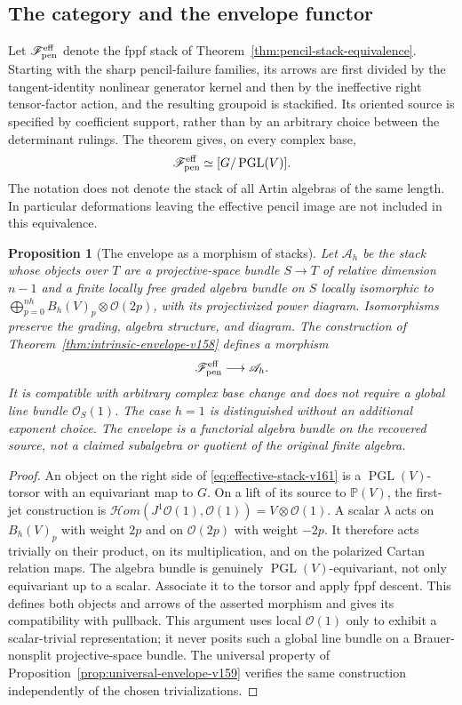\documentclass[11pt,reqno]{amsart}
\numberwithin{equation}{section}
\newtheorem{proposition}[theorem]{Proposition}
\theoremstyle{definition}\newtheorem{definition}[theorem]{Definition}
\theoremstyle{remark}\newtheorem{remark}[theorem]{Remark}
\newcommand{\Pj}{\mathbb P}\newcommand{\A}{\mathbb A}
\newcommand{\OO}{\mathcal O}\newcommand{\II}{\mathcal I}
\begin{document}
\subsection{The category and the envelope functor}
Let $\mathscr F_{\rm pen}^{\rm eff}$ denote the fppf stack of
Theorem~\ref{thm:pencil-stack-equivalence}. Starting with the sharp
pencil-failure families, its arrows are first divided by the
tangent-identity nonlinear generator kernel and then by the ineffective
right tensor-factor action, and the resulting groupoid is stackified.
Its oriented source is specified by coefficient support, rather than
by an arbitrary choice between the determinant rulings. The theorem
gives, on every complex base,
\begin{equation}\label{eq:effective-stack-v161}
       \mathscr F_{\rm pen}^{\rm eff}\simeq[G/\operatorname{PGL}(V)].
\end{equation}
The notation does not denote the stack of all Artin algebras of the
same length. In particular deformations leaving the effective
pencil image are not included in this equivalence.

\begin{proposition}[The envelope as a morphism of stacks]
\label{prop:envelope-stack-v161}
Let $\mathscr A_h$ be the stack whose objects over $T$ are a
projective-space bundle $S\to T$ of relative dimension $n-1$ and a
finite locally free graded algebra bundle on $S$ locally isomorphic
to $\bigoplus_{p=0}^{nh}B_h(V)_p\otimes\OO(2p)$, with its
projectivized power diagram. Isomorphisms preserve the grading,
algebra structure, and diagram. The construction of
Theorem~\ref{thm:intrinsic-envelope-v158} defines a morphism
\[
                \mathscr F_{\rm pen}^{\rm eff}\longrightarrow\mathscr A_h.
\]
It is compatible with arbitrary complex base change and does not
require a global line bundle $\OO_S(1)$. The case $h=1$ is
distinguished without an additional exponent choice. The envelope
is a functorial algebra bundle on the recovered source, not a
claimed subalgebra or quotient of the original finite algebra.
\end{proposition}
\begin{proof}
An object on the right side of \eqref{eq:effective-stack-v161} is a
$\operatorname{PGL}(V)$-torsor with an equivariant map to $G$.
On a lift of its source to $\Pj(V)$, the first-jet construction is
$\mathcal Hom(J^1\OO(1),\OO(1))=V\otimes\OO(1)$. A scalar
$\lambda$ acts on $B_h(V)_p$ with weight $2p$ and on $\OO(2p)$
with weight $-2p$. It therefore acts trivially on their product,
on its multiplication, and on the polarized Cartan relation maps.
The algebra bundle is genuinely $\operatorname{PGL}(V)$-equivariant,
not only equivariant up to a scalar. Associate it to the torsor and
apply fppf descent. This defines both objects and arrows of the
asserted morphism and gives its compatibility with pullback. This
argument uses local $\OO(1)$ only to exhibit a scalar-trivial
representation; it never posits such a global line bundle on a
Brauer-nonsplit projective-space bundle. The universal property of
Proposition~\ref{prop:universal-envelope-v159} verifies the same
construction independently of the chosen trivializations.
\end{proof}
\end{document}
